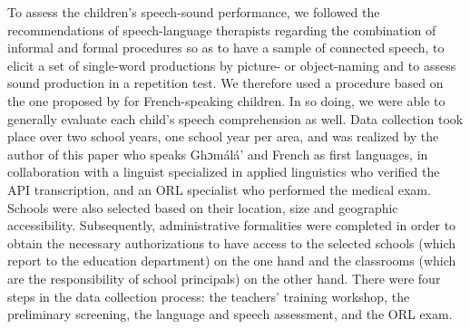 \documentclass[output=paper,newtxmath,modfonts,nonflat,draftmode]{langsci/langscibook}
\begin{document}
To assess the children’s speech-sound performance, we followed the recommendations of speech-language therapists regarding the combination of informal and formal procedures so as to have a sample of connected speech, to elicit a set of single-word productions by picture- or object-naming and to assess sound production in a repetition test. We therefore used a procedure based on the one proposed by \citet{Maurin-Cherou1993} for French-speaking children. In so doing, we were able to generally evaluate each child’s speech comprehension as well. Data collection took place over two school years, one school year per area, and was realized by the author of this paper who speaks Ghɔmálá’ and French as first languages, in collaboration with a linguist specialized in applied linguistics who verified the API transcription, and an ORL specialist who performed the medical exam. Schools were also selected based on their location, size and geographic accessibility. Subsequently, administrative formalities were completed in order to obtain the necessary authorizations to have access to the selected schools (which report to the education department) on the one hand and the classrooms (which are the responsibility of school principals) on the other hand. There were four steps in the data collection process: the teachers’ training workshop, the preliminary screening, the language and speech assessment, and the ORL exam.
\end{document}
